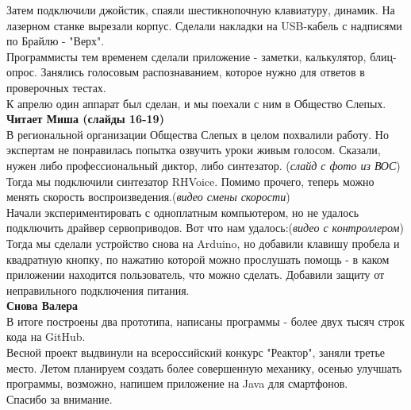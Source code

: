 \documentclass[a4paper,12pt]{article} %
\begin{document}
Затем подключили джойстик, спаяли шестикнопочную клавиатуру, динамик. На лазерном станке вырезали корпус. Сделали накладки на USB-кабель с надписями по Брайлю - "Верх".\\ %
Программисты тем временем сделали приложение - заметки, калькулятор, блиц-опрос. Занялись голосовым распознаванием, которое нужно для ответов в проверочных тестах. \\ %
К апрелю один аппарат был сделан, и мы поехали с ним в Общество Слепых. \\ %
\textbf{Читает Миша (слайды 16-19)}\\
В региональной организации Общества Слепых в целом похвалили работу. Но экспертам не понравилась попытка озвучить уроки живым голосом. Сказали, нужен либо профессиональный диктор, либо синтезатор. (\textit{слайд с фото из ВОС})\\ %
Тогда мы подключили синтезатор RHVoice. Помимо прочего, теперь можно менять скорость воспроизведения.(\textit{видео смены скорости})\\ 
Начали экспериментировать с одноплатным компьютером, но не удалось подключить драйвер сервоприводов. Вот что нам удалось:(\textit{видео с контроллером})\\
Тогда мы сделали устройство снова на Arduino, но добавили клавишу пробела и квадратную кнопку, по нажатию которой можно прослушать помощь - в каком приложении находится пользователь, что можно сделать. Добавили защиту от неправильного подключения питания.\\ %
\textbf{Снова Валера}\\
В итоге построены два прототипа, написаны программы - более двух тысяч строк кода на GitHub.\\
Весной проект выдвинули на всероссийский конкурс "Реактор", заняли третье место. Летом планируем создать более совершенную механику, осенью улучшать программы, возможно, напишем приложение на Java для смартфонов.\\
Спасибо за внимание.\\ %
\end{document}

